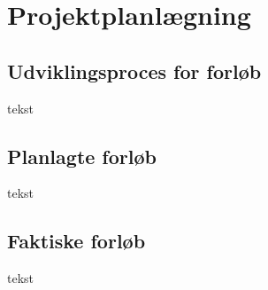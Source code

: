 \documentclass[../main.tex]{subfiles}
\begin{document}
\section{Projektplanlægning}

\subsection{Udviklingsproces for forløb}
\begin{flushleft}
   tekst
\end{flushleft}

\subsection{Planlagte forløb}
\begin{flushleft}
   tekst
\end{flushleft}

\subsection{Faktiske forløb}
\begin{flushleft}
   tekst
\end{flushleft}
\end{document}

